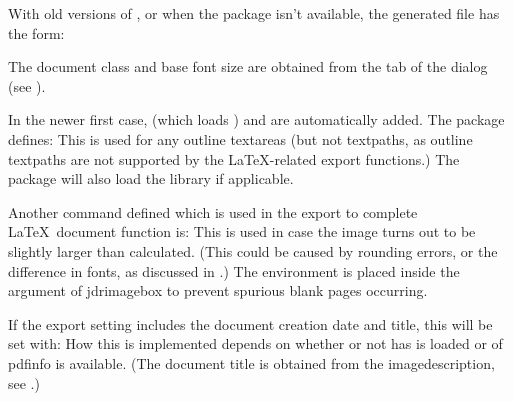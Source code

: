 With old versions of \FlowframTk, or when the 
package isn't available, the generated  file has the form:
\begin{compactcodebox}
\strut
{}










\end{compactcodebox}

The document class  and base font size
 are obtained from the
 tab of the
 dialog (see ).

In the newer first case,  (which loads
) and  are automatically added.
The  package defines:
This is used for any outline \glspl{textarea} (but not
\glspl{textpath}, as outline \glspl*{textpath} are not supported by
the \LaTeX-related export functions.) The package will also load the 
 library if applicable. 

Another command defined  which is used in the
export to complete \LaTeX\ document function is:
This is used in case the image turns out to be slightly larger than
calculated. (This could be caused by rounding errors, or the
difference in fonts, as discussed in .)
The  environment is placed inside the argument of
\gls{jdrimagebox} to prevent spurious blank pages occurring.

If the export setting includes the document creation date and
title, this will be set with:
How this is implemented depends on whether or not  has
is loaded or of \gls{pdfinfo} is available.
(The document title is obtained from the \gls{imagedescription}, see
.)

